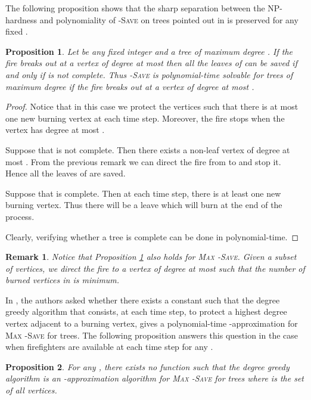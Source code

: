 \documentclass[10pt]{article}
\newcommand{\qedfill}[0]{ }
\newtheorem{remark}{Remark}
\newtheorem{proposition}{Proposition}
\begin{document}
The following proposition shows that the sharp separation between the NP-hardness and polynomiality of \textsc{-Save} on trees pointed out in \cite{king2010} is preserved for any fixed .

\begin{proposition}
\label{prop:polytree}
Let  be any fixed integer and  a tree of maximum degree . If the fire breaks out at a vertex
of degree at most  then all the leaves of  can be saved if and only if  is not complete. Thus \textsc{-Save} is polynomial-time solvable for trees of maximum degree  if the fire breaks out at a vertex of degree at most .
\end{proposition}

\begin{proof}
Notice that in this case we protect the vertices such that there is at most one new burning vertex  at each time step. Moreover, the fire stops when the vertex  has degree at most .

Suppose that  is not complete. Then there exists a non-leaf vertex  of degree at most . From the previous remark we can direct the fire from  to  and stop it. Hence all the leaves of  are saved.

Suppose that  is complete. Then at each time step, there is at least one new burning vertex. Thus there will be
a leave which will burn at the end of the process.

Clearly, verifying whether a tree is complete can be done in polynomial-time.\qedfill
\end{proof}

\begin{remark}
Notice that Proposition \ref{prop:polytree} also holds for \textsc{Max -Save}. Given a subset  of vertices, we direct the fire to a vertex of degree at most  such that the number of burned vertices in  is minimum.
\end{remark}

In \cite{finbow2009}, the authors asked whether there exists a constant  such that the degree greedy algorithm that consists, at each time step, to protect a highest degree vertex adjacent to a burning vertex, gives a polynomial-time -approximation for \textsc{Max -Save} for trees. The following proposition answers this question in the case when  firefighters are available at each time step for any .

\begin{proposition}
For any , there exists no function  such that the degree greedy algorithm is an -approximation algorithm for \textsc{Max -Save} for trees where  is the set of all vertices. 
\end{proposition}
\end{document}
